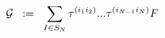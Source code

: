 \begin{equation}
{\cal{G}} \;\; := \;\; \sum_{I \in S_N} \tau^{( i_1 i_2 )} ... \tau^{( i_{N-1} i_N )} F
\label{eq:x6}
\end{equation}

